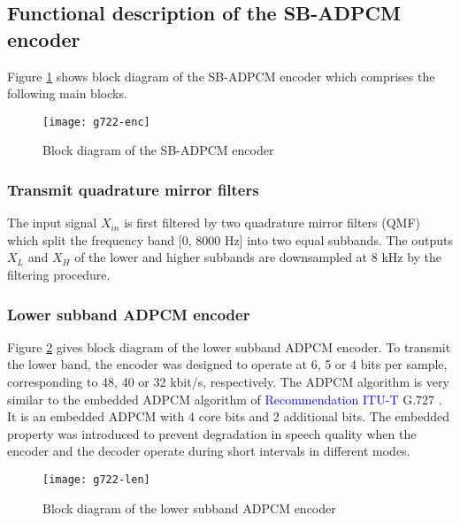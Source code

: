 \subsection{Functional description of the SB-ADPCM encoder}\label{G722:descr-encoder}

Figure \ref{G722:encoder} shows block diagram of the SB-ADPCM encoder
which comprises the following main blocks.

\begin{figure}
    \begin{center}
    \texttt{[image: g722-enc]}
  \end{center}
  \caption{Block diagram of the SB-ADPCM encoder
           \label{G722:encoder}}
\end{figure}

\subsubsection{Transmit quadrature mirror filters}

The input signal $X_{in}$ is first filtered by two quadrature mirror
filters (QMF) which split the frequency band [0, 8000 Hz] into two equal
subbands. The outputs $X_{L}$ and $X_{H}$ of the lower and higher subbands are downsampled at 8 kHz by the filtering procedure.


\subsubsection{Lower subband ADPCM encoder}

Figure \ref{G722:low-encoder} gives block diagram of the lower subband
ADPCM encoder. To transmit the lower band, the encoder was designed to
operate at 6, 5 or 4 bits per sample, corresponding to 48, 40 or 32
kbit/s, respectively. The ADPCM algorithm is very similar to the
embedded ADPCM algorithm of \textcolor{blue}{Recommendation ITU-T} G.727
\cite{G.727}. It is an embedded ADPCM with 4 core bits and 2
additional bits. The embedded property was introduced to prevent
degradation in speech quality when the encoder and the decoder operate
during short intervals in different modes.

\begin{figure}
    \begin{center}
    \texttt{[image: g722-len]}
  \end{center}
  \caption{Block diagram of the lower subband ADPCM encoder
           \label{G722:low-encoder}}
\end{figure}

